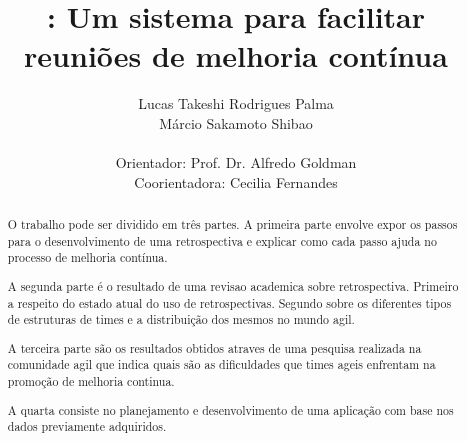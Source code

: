 \documentclass[titlepage, 12pt]{article}
\title{\suricato: Um sistema para facilitar reuniões de melhoria contínua}
\author{Lucas Takeshi Rodrigues Palma\\Márcio Sakamoto Shibao\\ \\Orientador: Prof. Dr. Alfredo Goldman\\Coorientadora: Cecilia Fernandes}
\begin{document}
	

\maketitle

\begin{abstract}
O trabalho pode ser dividido em três partes. A primeira parte envolve expor os passos para o desenvolvimento de uma retrospectiva e explicar como cada passo ajuda no processo de melhoria contínua.

A segunda parte é o resultado de uma revisao academica sobre retrospectiva. Primeiro a respeito do estado atual do uso de retrospectivas. Segundo sobre os diferentes tipos de estruturas de times e a distribuição dos mesmos no mundo agil.

A terceira parte são os resultados obtidos atraves de uma pesquisa realizada na comunidade agil que indica quais são as dificuldades que times ageis enfrentam na promoção de melhoria continua.

A quarta consiste no planejamento e desenvolvimento de uma aplicação com base nos dados previamente adquiridos.




\end{abstract}
\newpage
\end{document}

